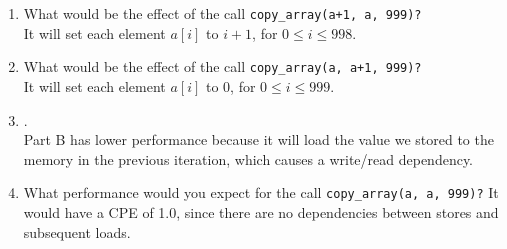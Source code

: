\documentclass{article}
\begin{document}
\begin{enumerate}[label=\textbf{\Alph*.}]
	\item What would be the effect of the call \texttt{copy\_array(a+1, a, 999)?} \\
	It will set each element $a[i]$ to $i+1$, for $0 \leq i \leq 998$. \\
	\item What would be the effect of the call \texttt{copy\_array(a, a+1, 999)?} \\
	It will set each element $a[i]$ to 0, for $ 0 \leq i \leq 999$. \\
	\item . \\
	Part B has lower performance because it will load the value we stored to 
	the memory in the previous iteration, which causes a write\slash read dependency. \\
	\item What performance would you expect for the call \texttt{copy\_array(a, a, 999)?}
	It would have a CPE of 1.0, since there are no dependencies between stores and
	subsequent loads. \\
\end{enumerate}
\end{document}
